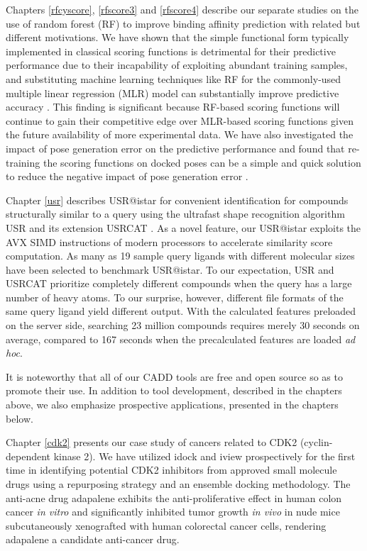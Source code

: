 Chapters \ref{rfcyscore}, \ref{rfscore3} and \ref{rfscore4} describe our separate studies \citep{1432,1433,1434} on the use of random forest (RF) to improve binding affinity prediction with related but different motivations. We have shown that the simple functional form typically implemented in classical scoring functions is detrimental for their predictive performance due to their incapability of exploiting abundant training samples, and substituting machine learning techniques like RF for the commonly-used multiple linear regression (MLR) model can substantially improve predictive accuracy \citep{1432,1433}. This finding is significant because RF-based scoring functions will continue to gain their competitive edge over MLR-based scoring functions given the future availability of more experimental data. We have also investigated the impact of pose generation error on the predictive performance and found that re-training the scoring functions on docked poses can be a simple and quick solution to reduce the negative impact of pose generation error \citep{1434}.

Chapter \ref{usr} describes USR@istar for convenient identification for compounds structurally similar to a query using the ultrafast shape recognition algorithm USR \citep{1379} and its extension USRCAT \citep{1331}. As a novel feature, our USR@istar exploits the AVX SIMD instructions of modern processors to accelerate similarity score computation. As many as 19 sample query ligands with different molecular sizes have been selected to benchmark USR@istar. To our expectation, USR and USRCAT prioritize completely different compounds when the query has a large number of heavy atoms. To our surprise, however, different file formats of the same query ligand yield different output. With the calculated features preloaded on the server side, searching 23 million compounds requires merely 30 seconds on average, compared to 167 seconds when the precalculated features are loaded \textit{ad hoc}.

It is noteworthy that all of our CADD tools are free and open source so as to promote their use. In addition to tool development, described in the chapters above, we also emphasize prospective applications, presented in the chapters below.

Chapter \ref{cdk2} presents our case study of cancers related to CDK2 (cyclin-dependent kinase 2). We have utilized idock \citep{1153,1362} and \citep{1366} iview prospectively for the first time in identifying potential CDK2 inhibitors from approved small molecule drugs using a repurposing strategy and an ensemble docking methodology. The anti-acne drug adapalene exhibits the anti-proliferative effect in human colon cancer \textit{in vitro} and significantly inhibited tumor growth \textit{in vivo} in nude mice subcutaneously xenografted with human colorectal cancer cells, rendering adapalene a candidate anti-cancer drug.

